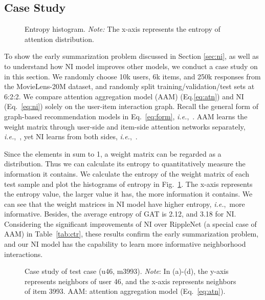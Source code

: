\documentclass[sigconf]{acmart}
\newcommand{\ie}{\emph{i.e.},~}
\begin{document}
\subsection{Case Study}\label{sec:cs}
\begin{figure}
    \caption{Entropy histogram. \emph{Note:} The x-axis represents the entropy of attention distribution.}
    \label{fig:hist}
\end{figure}


To show the early summarization problem discussed in Section \ref{sec:ni}, as well as to understand how NI model improves other models, 
we conduct a case study on in this section. We randomly choose 10k users, 6k items, and 250k responses from the MovieLens-20M dataset, and randomly split training/validation/test sets at 6:2:2. 
We compare attention aggregation model (AAM) (Eq.\eqref{eq:atn}) and NI (Eq.~\eqref{eq:ni}) solely on the user-item interaction graph. Recall the general form of graph-based recommendation models in Eq.~\eqref{eq:form}, \ie . 
AAM learns the weight matrix  through user-side and item-side attention networks separately, \ie , yet NI learns from both sides, \ie . 

Since the elements in  sum to 1, a weight matrix can be regarded as a distribution. Thus we can calculate its entropy to quantitatively measure the information it contains. We calculate the entropy of the weight matrix  of each test sample and plot the histograms of entropy in Fig.~\ref{fig:hist}. The x-axis represents the entropy value, the larger value it has, the more information it contains. 
We can see that the weight matrices in NI model have higher entropy, \ie more informative. Besides, the average entropy of GAT is 2.12, and 3.18 for NI. Considering the significant improvements of NI over RippleNet (a special case of AAM) in Table~\ref{tab:ctr}, these results confirm the early summarization problem, and our NI model has the capability to learn more informative neighborhood interactions.

\begin{figure}
    \caption{Case study of test case (u46, m3993). \emph{Note}: In (a)-(d), the y-axis represents neighbors of user 46, and the x-axis represents neighbors of item 3993. AAM: attention aggregation model (Eq.~\eqref{eq:atn}).}
    \label{fig:case}
\end{figure}
\end{document}
